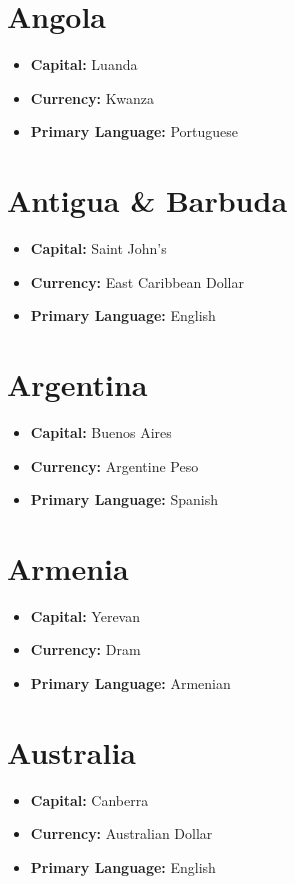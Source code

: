 \documentclass[a4paper,100pt,twoside]{book}
\begin{document}
\section*{\Huge Angola}
\vspace{5mm} %
\begin{itemize}
	\item \textbf{Capital:} Luanda
	\item \textbf{Currency:} Kwanza
	\item \textbf{Primary Language:} Portuguese
\end{itemize}

\section*{\Huge Antigua \& Barbuda}
\vspace{5mm} %
\begin{itemize}
	\item \textbf{Capital:} Saint John's
	\item \textbf{Currency:} East Caribbean Dollar
	\item \textbf{Primary Language:} English
\end{itemize}

\section*{\Huge Argentina}
\vspace{5mm} %
\begin{itemize}
	\item \textbf{Capital:} Buenos Aires
	\item \textbf{Currency:} Argentine Peso
	\item \textbf{Primary Language:} Spanish
\end{itemize}

\section*{\Huge Armenia}
\vspace{5mm} %
\begin{itemize}
	\item \textbf{Capital:} Yerevan
	\item \textbf{Currency:} Dram
	\item \textbf{Primary Language:} Armenian
\end{itemize}

\section*{\Huge Australia}
\vspace{5mm} %
\begin{itemize}
	\item \textbf{Capital:} Canberra
	\item \textbf{Currency:} Australian Dollar
	\item \textbf{Primary Language:} English
\end{itemize}
\end{document}
